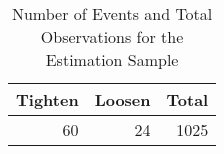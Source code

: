 \begin{table}[ht]
\centering
\caption{Number of Events and Total Observations for the Estimation Sample} 
\label{sampsize}
\begin{tabular}{rrr}
  \hline
Tighten & Loosen & Total \\ 
  \hline
 60 &  24 & 1025 \\ 
   \hline
\end{tabular}
\end{table}
